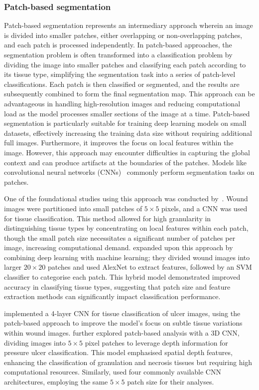 \subsubsection{Patch-based segmentation}
Patch-based segmentation represents an intermediary approach wherein an image is divided into smaller patches, either overlapping or non-overlapping patches, and each patch is processed independently.
In patch-based approaches, the segmentation problem is often transformed into a classification problem by dividing the image into smaller patches and classifying each patch according to its tissue type, simplifying the segmentation task into a series of patch-level classifications.
Each patch is then classified or segmented, and the results are subsequently combined to form the final segmentation map. This approach can be advantageous in handling high-resolution images and reducing computational load as the model processes smaller sections of the image at a time. Patch-based segmentation is particularly suitable for training deep learning models on small datasets, effectively increasing the training data size without requiring additional full images.
Furthermore, it improves the focus on local features within the image. However, this approach may encounter difficulties in capturing the global context and can produce artifacts at the boundaries of the patches. Models like convolutional neural networks (CNNs)~\citep{MET7alzubaidi2021review} commonly perform segmentation tasks on patches.

One of the foundational studies using this approach was conducted by~\citet{RW25zahia2018tissue}. Wound images were partitioned into small patches of $5\times5$ pixels, and a CNN was used for tissue classification. This method allowed for high granularity in distinguishing tissue types by concentrating on local features within each patch, though the small patch size necessitates a significant number of patches per image, increasing computational demand. \citet{RW26nejati2018fine} expanded upon this approach by combining deep learning with machine learning; they divided wound images into larger $20\times20$ patches and used AlexNet to extract features, followed by an SVM classifier to categorise each patch. This hybrid model demonstrated improved accuracy in classifying tissue types, suggesting that patch size and feature extraction methods can significantly impact classification performance.

\citet{RW28rajathi2019varicose} implemented a 4-layer CNN for tissue classification of ulcer images, using the patch-based approach to improve the model's focus on subtle tissue variations within wound images. \citet{RW35garcia2018classification} further explored patch-based analysis with a 3D CNN, dividing images into $5\times5$ pixel patches to leverage depth information for pressure ulcer classification. This model emphasised spatial depth features, enhancing the classification of granulation and necrosis tissues but requiring high computational resources. Similarly, \citet{reifs2023clinical} used four commonly available CNN architectures, employing the same $5 \times 5$ patch size for their analyses.

